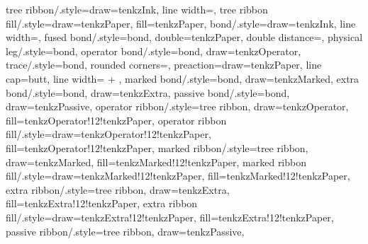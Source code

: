{  tree ribbon/.style={draw=tenkzInk, line width=\tenkz@wirewidth},
  tree ribbon fill/.style={draw=tenkzPaper, fill=tenkzPaper},
  bond/.style={draw=tenkzInk, line width=\tenkz@wirewidth},
  fused bond/.style={bond, double=tenkzPaper,
      double distance=\tenkz@fusedwiregap},
  physical leg/.style={bond},
  operator bond/.style={bond, draw=tenkzOperator},
  trace/.style={bond, rounded corners=\tenkz@dim{\tenkz@r@corner},
      preaction={draw=tenkzPaper, line cap=butt,
        line width=\dimexpr\tenkz@wirewidth
          + \tenkz@dim{\tenkz@r@crossgap}\relax}},
  marked bond/.style={bond, draw=tenkzMarked},
  extra bond/.style={bond, draw=tenkzExtra},
  passive bond/.style={bond, draw=tenkzPassive},
  operator ribbon/.style={tree ribbon, draw=tenkzOperator,
      fill=tenkzOperator!12!tenkzPaper},
  operator ribbon fill/.style={draw=tenkzOperator!12!tenkzPaper,
      fill=tenkzOperator!12!tenkzPaper},
  marked ribbon/.style={tree ribbon, draw=tenkzMarked,
      fill=tenkzMarked!12!tenkzPaper},
  marked ribbon fill/.style={draw=tenkzMarked!12!tenkzPaper,
      fill=tenkzMarked!12!tenkzPaper},
  extra ribbon/.style={tree ribbon, draw=tenkzExtra,
      fill=tenkzExtra!12!tenkzPaper},
  extra ribbon fill/.style={draw=tenkzExtra!12!tenkzPaper,
      fill=tenkzExtra!12!tenkzPaper},
  passive ribbon/.style={tree ribbon, draw=tenkzPassive,
}}
